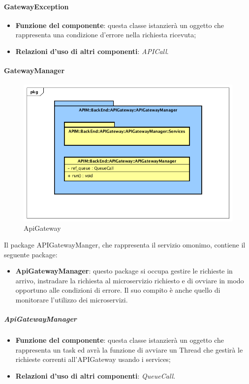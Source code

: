 \paragraph{GatewayException}
\begin{itemize}
	\item \textbf{Funzione del componente}: questa classe istanzier\`{a} un oggetto che rappresenta una condizione d'errore nella richiesta ricevuta;
	\item \textbf{Relazioni d'uso di altri componenti}: \textit{APICall}.
\end{itemize}

\paragraph{GatewayManager}
\begin{figure}[!htbp]
	\centering
	\includegraphics[scale=0.45]{UML/DiagrammiPackage/APIGatewayManager.png}
	\caption{ApiGateway}
\end{figure}

Il package APIGatewayManger, che rappresenta il servizio omonimo, contiene il seguente package:
\begin{itemize}
	\item \textbf{ApiGatewayManager}: questo package si occupa gestire le richieste in arrivo, instradare la richiesta al microservizio richiesto e di ovviare in modo opportuno alle condizioni di errore. Il suo compito \`{e} anche quello di monitorare  l'utilizzo dei microservizi.
\end{itemize}

\subparagraph{ApiGatewayManager}
\begin{itemize}
	\item \textbf{Funzione del componente}: questa classe istanzier\`{a} un oggetto che rappresenta un task ed avr\`{a} la funzione di avviare un Thread che gestir\`{a} le richieste correnti all'APIGateway usando i services;
	\item \textbf{Relazioni d'uso di altri componenti}: \textit{QueueCall}.
\end{itemize}

